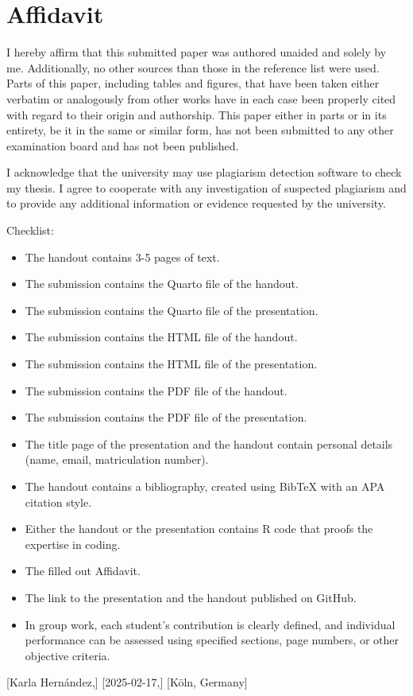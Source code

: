 \documentclass[
  stu,
  floatsintext,
  longtable,
  a4paper,
  nolmodern,
  notxfonts,
  notimes,
  colorlinks=true,linkcolor=blue,citecolor=blue,urlcolor=blue]{apa7}
\providecommand{\tightlist}{%
  \setlength{\itemsep}{0pt}\setlength{\parskip}{0pt}}
\begin{document}
\appendix

\section{Affidavit}\label{apx-affidavit}

I hereby affirm that this submitted paper was authored unaided and
solely by me. Additionally, no other sources than those in the reference
list were used. Parts of this paper, including tables and figures, that
have been taken either verbatim or analogously from other works have in
each case been properly cited with regard to their origin and
authorship. This paper either in parts or in its entirety, be it in the
same or similar form, has not been submitted to any other examination
board and has not been published.

I acknowledge that the university may use plagiarism detection software
to check my thesis. I agree to cooperate with any investigation of
suspected plagiarism and to provide any additional information or
evidence requested by the university.

Checklist:

\begin{itemize}
\tightlist
\item[$\boxtimes$]
  The handout contains 3-5 pages of text.
\item[$\boxtimes$]
  The submission contains the Quarto file of the handout.
\item[$\boxtimes$]
  The submission contains the Quarto file of the presentation.
\item[$\boxtimes$]
  The submission contains the HTML file of the handout.
\item[$\boxtimes$]
  The submission contains the HTML file of the presentation.
\item[$\boxtimes$]
  The submission contains the PDF file of the handout.
\item[$\boxtimes$]
  The submission contains the PDF file of the presentation.
\item[$\boxtimes$]
  The title page of the presentation and the handout contain personal
  details (name, email, matriculation number).
\item[$\boxtimes$]
  The handout contains a bibliography, created using BibTeX with an APA
  citation style.
\item[$\boxtimes$]
  Either the handout or the presentation contains R code that proofs the
  expertise in coding.
\item[$\boxtimes$]
  The filled out Affidavit.
\item[$\boxtimes$]
  The link to the presentation and the handout published on GitHub.
\item[$\square$]
  In group work, each student's contribution is clearly defined, and
  individual performance can be assessed using specified sections, page
  numbers, or other objective criteria.
\end{itemize}

{[}Karla Hernández,{]} {[}2025-02-17,{]} {[}Köln, Germany{]}
\end{document}
